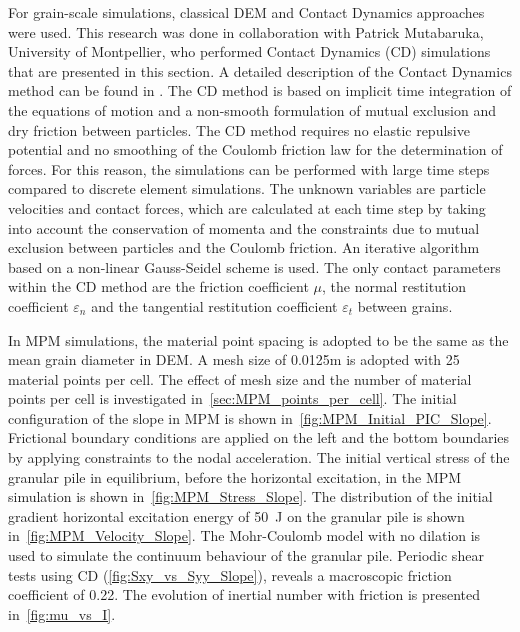 \documentclass[3p,times,procedia,number]{elsarticle}
\begin{document}
For grain-scale simulations, classical DEM and Contact Dynamics approaches were 
used. This research was done in collaboration with Patrick Mutabaruka, 
University of Montpellier, who performed Contact Dynamics (CD) simulations that 
are presented in this section. A detailed description of the Contact Dynamics 
method can be found in \cite{Moreau1993,Jean1999,Radjai2009,Radjai2011}. 
The CD method is based on implicit time integration of the equations of motion 
and a non-smooth formulation of mutual exclusion and dry friction between 
particles. The CD method requires no elastic repulsive potential and no 
smoothing of the Coulomb friction law for the determination of forces. 
For this reason, the simulations can be performed with large time steps 
compared to discrete element simulations. The unknown variables are particle 
velocities and contact forces, which are calculated at each time step by taking 
into account the conservation of momenta and the constraints due to mutual 
exclusion between particles and the Coulomb friction. An iterative 
algorithm based on a non-linear Gauss-Seidel scheme is used. The only 
contact parameters within the CD method are the friction coefficient $\mu$, the 
normal restitution coefficient $\varepsilon_n$ and the tangential restitution 
coefficient $\varepsilon_t$ between grains. 

In MPM simulations, the material point spacing is adopted to be the same as the 
mean grain diameter in DEM. A mesh size of 0.0125m is adopted with 25 material 
points per cell. The effect of mesh size and the number of material points per 
cell is investigated in~\cref{sec:MPM_points_per_cell}. The initial 
configuration of the slope in MPM is shown in~\cref{fig:MPM_Initial_PIC_Slope}. 
Frictional boundary conditions are applied on the left and the bottom 
boundaries by applying constraints to the nodal acceleration. The initial 
vertical stress of the granular pile in equilibrium, before the horizontal 
excitation, in the MPM simulation is shown in~\cref{fig:MPM_Stress_Slope}. The 
distribution of the initial gradient horizontal excitation energy of 50~\si{J} 
on the granular pile is shown in~\cref{fig:MPM_Velocity_Slope}. The 
Mohr-Coulomb model with no dilation is used to simulate the continuum behaviour 
of the granular pile. Periodic shear tests using CD 
(\cref{fig:Sxy_vs_Syy_Slope}), reveals a macroscopic friction coefficient of 
0.22. The evolution of inertial number with friction is presented 
in~\cref{fig:mu_vs_I}. 
\end{document}

